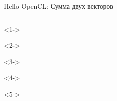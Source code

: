 \documentclass[@BEAMER_OPTIONS@]{beamer}
\begin{document}
\begin{frame}[fragile]{Hello OpenCL: Сумма двух векторов}
    \vspace{-1\baselineskip}
    \begin{columns}
        \begin{column}{0.2\textwidth}
            \begin{minipage}[c][\textheight][c]{\linewidth}
                \begin{exampleblock}{}
                    \begin{adjustbox}{width=0.19\textwidth, height=\textheight, keepaspectratio}
                        \begin{minipage}{\textwidth}
                            \begin{uncoverenv}<1->
                                
                            \end{uncoverenv}
                            \begin{uncoverenv}<2->
                                
                            \end{uncoverenv}
                            \begin{uncoverenv}<3->
                                
                            \end{uncoverenv}
                            \begin{uncoverenv}<4->
                                
                            \end{uncoverenv}
                            \begin{uncoverenv}<5->
                                
                            \end{uncoverenv}
                        \end{minipage}
                    \end{adjustbox}
                \end{exampleblock}
            \end{minipage}
        \end{column}
        \begin{column}{0.7\textwidth}
            \begin{minipage}[c][\textheight][c]{\linewidth}

\end{minipage}
\end{column}
\end{columns}
\end{frame}
\end{document}
